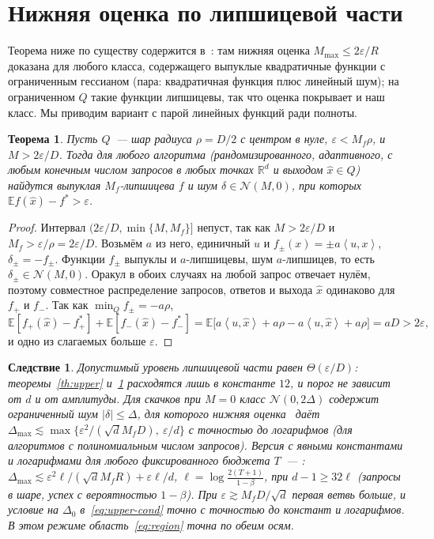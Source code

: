 \documentclass[12pt,a4paper]{article}
\theoremstyle{plain}
\newtheorem{theorem}{Теорема}
\newtheorem{corollary}{Следствие}
\theoremstyle{definition}
\theoremstyle{remark}
\newcommand{\E}{\mathbb{E}}
\newcommand{\R}{\mathbb{R}}
\newcommand{\eps}{\varepsilon}
\newcommand{\abs}[1]{\left\lvert #1\right\rvert}
\newcommand{\ip}[2]{\left\langle #1,#2\right\rangle}
\begin{document}
\section{Нижняя оценка по липшицевой части}

Теорема ниже по существу содержится в~\cite[предложение~E.7]{LDT26}: там нижняя оценка $M_{\max}\le2\eps/R$ доказана для любого класса, содержащего выпуклые квадратичные функции с ограниченным гессианом (пара: квадратичная функция плюс линейный шум); на ограниченном $Q$ такие функции липшицевы, так что оценка покрывает и наш класс. Мы приводим вариант с парой линейных функций ради полноты.

\begin{theorem}\label{th:lower}
Пусть $Q$~--- шар радиуса $\rho=D/2$ с центром в нуле, $\eps<M_f\rho$, и $M>2\eps/D$. Тогда для любого алгоритма (рандомизированного, адаптивного, с любым конечным числом запросов в любых точках $\R^d$ и выходом $\hat x\in Q$) найдутся выпуклая $M_f$-липшицева $f$ и шум $\delta\in\mathcal N(M,0)$, при которых $\E f(\hat x)-f^*>\eps$.
\end{theorem}
\begin{proof}
Интервал $(2\eps/D,\min\{M,M_f\}]$ непуст, так как $M>2\eps/D$ и $M_f>\eps/\rho=2\eps/D$. Возьмём $a$ из него, единичный $u$ и $f_\pm(x)=\pm a\ip ux$, $\delta_\pm=-f_\pm$. Функции $f_\pm$ выпуклы и $a$-липшицевы, шум $a$-липшицев, то есть $\delta_\pm\in\mathcal N(M,0)$. Оракул в обоих случаях на любой запрос отвечает нулём, поэтому совместное распределение запросов, ответов и выхода $\hat x$ одинаково для $f_+$ и $f_-$. Так как $\min_Qf_\pm=-a\rho$,
\[
  \E[f_+(\hat x)-f_+^*]+\E[f_-(\hat x)-f_-^*]=\E\bigl[a\ip u{\hat x}+a\rho-a\ip u{\hat x}+a\rho\bigr]=aD>2\eps,
\]
и одно из слагаемых больше $\eps$.
\end{proof}

\begin{corollary}
Допустимый уровень липшицевой части равен $\Theta(\eps/D)$: теоремы~\ref{th:upper} и~\ref{th:lower} расходятся лишь в константе $12$, и порог не зависит от $d$ и от амплитуды. Для скачков при $M=0$ класс $\mathcal N(0,2\Delta)$ содержит ограниченный шум $\abs\delta\le\Delta$, для которого нижняя оценка~\cite{rl} даёт $\Delta_{\max}\lesssim\max\{\eps^2/(\sqrt dM_fD),\ \eps/d\}$ с точностью до логарифмов (для алгоритмов с полиномиальным числом запросов). Версия с явными константами и логарифмами для любого фиксированного бюджета $T$~--- \cite[теорема~III.1]{PPTG}: $\Delta_{\max}\lesssim\eps^2\ell/(\sqrt d M_fR)+\eps\ell/d$, $\ell=\log\frac{2(T+1)}{1-\beta}$, при $d-1\ge32\ell$ (запросы в шаре, успех с вероятностью $1-\beta$). При $\eps\gtrsim M_fD/\sqrt d$ первая ветвь больше, и условие на $\Delta_0$ в~\eqref{eq:upper-cond} точно с точностью до констант и логарифмов. В этом режиме область~\eqref{eq:region} точна по обеим осям.
\end{corollary}
\end{document}
